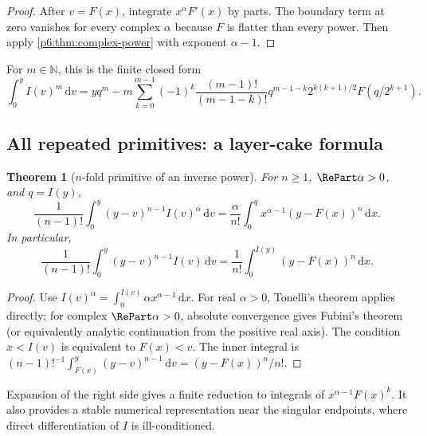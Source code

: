 \documentclass[11pt,oneside]{article}
\newtheorem{theorem}{Theorem}[section]
\theoremstyle{definition}
\theoremstyle{remark}
\newcommand{\N}{\mathbb N}
\newcommand{\dd}{\,\mathrm d}
\newcommand{\1}{\mathbf 1}
\begin{document}
\begin{proof}
After \(v=F(x)\), integrate \(x^\alpha F'(x)\) by parts.  The boundary term at zero
vanishes for every complex \(\alpha\) because \(F\) is flatter than every power.  Then
apply \cref{p6:thm:complex-power} with exponent \(\alpha-1\).
\end{proof}

For \(m\in\N\), this is the finite closed form
\begin{equation}
 \int_0^yI(v)^m\dd v
 =yq^m-m\sum_{k=0}^{m-1}(-1)^k
   \frac{(m-1)!}{(m-1-k)!}q^{m-1-k}
   2^{k(k+1)/2}F(q/2^{k+1}).                              \label{p6:eq:inverse-integer-power}
\end{equation}

\subsection{All repeated primitives: a layer-cake formula}

\begin{theorem}[\(n\)-fold primitive of an inverse power]
\label{p6:thm:inverse-nfold}
For \(n\ge1\), \(\RePart\alpha>0\), and \(q=I(y)\),
\begin{equation}
 \frac1{(n-1)!}\int_0^y(y-v)^{n-1}I(v)^\alpha\dd v
 =\frac{\alpha}{n!}\int_0^q x^{\alpha-1}(y-F(x))^n\dd x. \label{p6:eq:inverse-nfold}
\end{equation}
In particular,
\begin{equation}
 \frac1{(n-1)!}\int_0^y(y-v)^{n-1}I(v)\dd v
 =\frac1{n!}\int_0^{I(y)}(y-F(x))^n\dd x.                \label{p6:eq:inverse-nfold-alpha1}
\end{equation}
\end{theorem}

\begin{proof}
Use
\(
 I(v)^\alpha=\int_0^{I(v)}\alpha x^{\alpha-1}\dd x
\).  For real \(\alpha>0\), Tonelli's theorem applies directly; for complex
\(\RePart\alpha>0\), absolute convergence gives Fubini's theorem (or equivalently
analytic continuation from the positive real axis).  The condition \(x<I(v)\) is equivalent to \(F(x)<v\).  The
inner integral is
\(
 (n-1)!^{-1}\int_{F(x)}^y(y-v)^{n-1}\dd v=(y-F(x))^n/n!.
\)
\end{proof}

Expansion of the right side gives a finite reduction to integrals of
\(x^{\alpha-1}F(x)^k\).  It also provides a stable numerical representation near the
singular endpoints, where direct differentiation of \(I\) is ill-conditioned.
\end{document}
